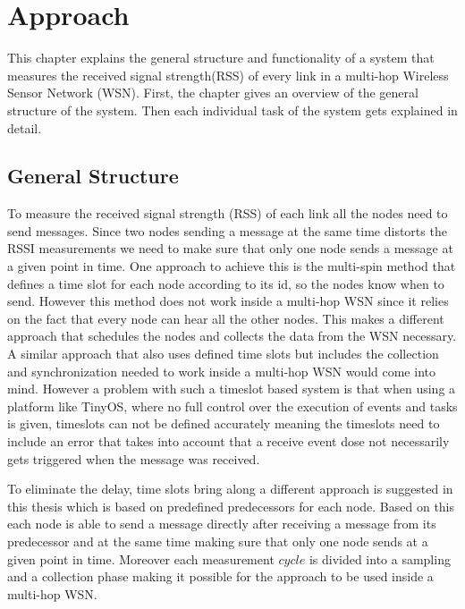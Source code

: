 \chapter{Approach}
\label{chp:apr}
This chapter explains the general structure and functionality of a system that measures the received signal strength(RSS) of every link in a multi-hop Wireless Sensor Network (WSN). First, the chapter gives an overview of the general structure of the system. Then each individual task of the system gets explained in detail.

\section{General Structure}
\label{chp:apr_general}

To measure the received signal strength (RSS) of each link all the nodes need to send messages. Since two nodes sending a message at the same time distorts the RSSI measurements we need to make sure that only one node sends a message at a given point in time. One approach to achieve this is the multi-spin method that defines a time slot for each node according to its id, so the nodes know when to send. However this method does not work inside a multi-hop WSN since it relies on the fact that every node can hear all the other nodes. This makes a different approach that schedules the nodes and collects the data from the WSN necessary. A similar approach that also uses defined time slots but includes the collection and synchronization needed to work inside a multi-hop WSN would come into mind. However a problem with such a timeslot based system is that when using a platform like TinyOS, where no full control over the execution of events and tasks is given, timeslots can not be defined accurately meaning the timeslots need to include an error that takes into account that a receive event dose not necessarily gets triggered when the message was received.
 
To eliminate the delay, time slots bring along a different approach is suggested in this thesis which is based on predefined predecessors for each node. Based on this each node is able to send a message directly after receiving a message from its predecessor and at the same time making sure that only one node sends at a given point in time. Moreover each measurement $cycle$ is divided into a sampling and a collection phase making it possible for the approach to be used inside a multi-hop WSN.

